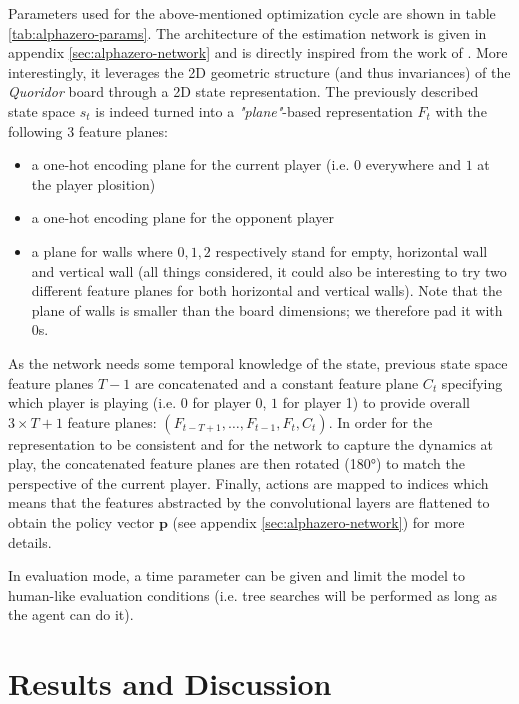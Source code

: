 \documentclass[journal, a4paper]{IEEEtran}
\begin{document}
    Parameters used for the above-mentioned optimization cycle are shown in table \ref{tab:alphazero-params}. The architecture of the estimation network is given in appendix \ref{sec:alphazero-network} and is directly inspired from the work of \cite{alphazero}. More interestingly, it leverages the 2D geometric structure (and thus invariances) of the \textit{Quoridor} board through a 2D state representation. The previously described state space $s_t$ is indeed turned into a \textit{"plane"}-based representation $F_t$ with the following $3$ feature planes:
    \begin{itemize}
        \item a one-hot encoding plane for the current player (i.e. $0$ everywhere and $1$ at the player plosition)
        \item a one-hot encoding plane for the opponent player 
        \item a plane for walls where $0, 1, 2$ respectively stand for empty, horizontal wall and vertical wall (all things considered, it could also be interesting to try two different feature planes for both horizontal and vertical walls). Note that the plane of walls is smaller than the board dimensions; we therefore pad it with $0$s.
    \end{itemize}  
    As the network needs some temporal knowledge of the state, previous state space feature planes $T-1$ are concatenated and a constant feature plane $C_t$ specifying which player is playing (i.e. $0$ for player 0, $1$ for player 1) to provide overall $3\times T + 1$ feature planes: $(F_{t-T+1}, \ldots, F_{t-1}, F_t, C_t)$. In order for the representation to be consistent and for the network to capture the dynamics at play, the concatenated feature planes are then rotated (180°) to match the perspective of the current player. Finally, actions are mapped to indices which means that the features abstracted by the convolutional layers are flattened to obtain the policy vector $\mathbf{p}$ (see appendix \ref{sec:alphazero-network}) for more details.
    
    In evaluation mode, a time parameter can be given and limit the model to human-like evaluation conditions (i.e. tree searches will be performed as long as the agent can do it).


\section{Results and Discussion}
\label{sec:results}
\end{document}
